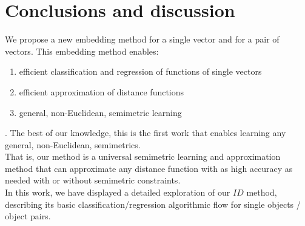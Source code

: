 
\chapter{Conclusions and discussion} %

\label{Chapter9} 

We propose a new embedding method for a single vector and for a pair
of vectors. This embedding method enables: 
\begin{enumerate}
	\item efficient classification and regression of functions of single vectors
	\item efficient approximation of distance functions
	\item general, non-Euclidean, semimetric learning
\end{enumerate}.
The best of our knowledge, this is the first work that enables learning any general, non-Euclidean, semimetrics.\\ 
That is, our method is a universal semimetric learning and approximation method that can approximate any distance function with as high accuracy as needed with or without semimetric constraints.\\
In this work, we have displayed a detailed exploration of our $ID$ method, describing its basic classification/regression algorithmic flow for single objects / object pairs.